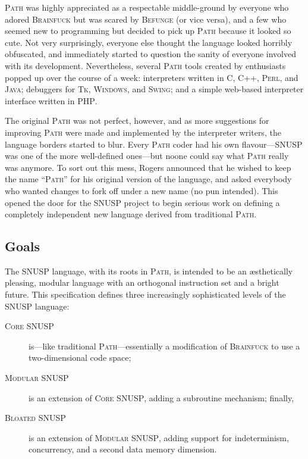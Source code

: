 \documentclass[a4paper]{article}
\begin{document}
\textsc{Path} was highly appreciated as a respectable middle-ground by
everyone who adored \textsc{Brainfuck} but was scared by \textsc{Befunge} (or
vice versa), and a few who seemed new to programming but decided to pick up
\textsc{Path} because it looked so cute.  Not very surprisingly, everyone else
thought the language looked horribly obfuscated, and immediately started to
question the sanity of everyone involved with its development.  Nevertheless,
several \textsc{Path} tools created by enthusiasts popped up over the course
of a week: interpreters written in \textsc{C}, \textsc{C++}, \textsc{Perl},
and \textsc{Java}; debuggers for \textsc{Tk}, \textsc{Windows}, and
\textsc{Swing}; and a simple web-based interpreter interface written in
\textsc{PHP}.

The original \textsc{Path} was not perfect, however, and as more suggestions
for improving \textsc{Path} were made and implemented by the interpreter
writers, the language borders started to blur.  Every \textsc{Path} coder had
his own flavour---\textsc{SNUSP} was one of the more well-defined ones---but
noone could say what \textsc{Path} really was anymore.  To sort out this mess,
Rogers announced that he wished to keep the name ``\textsc{Path}'' for his
original version of the language, and asked everybody who wanted changes to
fork off under a new name (no pun intended).  This opened the door for the
\textsc{SNUSP} project to begin serious work on defining a completely
independent new language derived from traditional \textsc{Path}.



\subsection{Goals}

The \textsc{SNUSP} language, with its roots in \textsc{Path}, is intended to
be an \ae sthetically pleasing, modular language with an orthogonal
instruction set and a bright future.  This specification defines three
increasingly sophisticated levels of the \textsc{SNUSP} language:

\begin{description}

\item[\textsc{Core SNUSP}] is---like traditional \textsc{Path}---essentially a
modification of \textsc{Brainfuck} to use a two-di\-men\-sion\-al code space;

\item[\textsc{Modular SNUSP}] is an extension of \textsc{Core SNUSP}, adding a
subroutine mechanism; finally,

\item[\textsc{Bloated SNUSP}] is an extension of \textsc{Modular SNUSP},
adding support for indeterminism, concurrency, and a second data memory
dimension.

\end{description}
\end{document}
